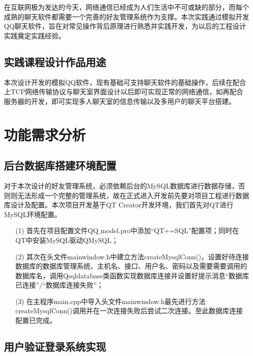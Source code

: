 \documentclass{progartcn}
\begin{document}
在互联网极为发达的今天，网络通信已经成为人们生活中不可或缺的部分，而每个成熟的聊天软件都需要一个完善的好友管理系统作为支撑。本次实践通过模拟开发QQ聊天软件，旨在对常见操作背后原理进行熟悉并实践开发，为以后的工程设计实践奠定实践经验。

\subsection{实践课程设计作品用途}

本次设计开发的模拟QQ软件，现有基础可支持聊天软件的基础操作，后续在配合上TCP网络传输协议与聊天室界面设计以后即可实现正常的网络通信，如再配合服务器的开发，即可实现多人聊天室的信息传输以及多用户的聊天平台搭建。

\section{功能需求分析}

\subsection{后台数据库搭建环境配置}

对于本次设计的好友管理系统，必须依赖后台的MySQL数据库进行数据存储，否则则无法形成一个完整的管理系统，故在正式进入开发前先要对项目工程进行数据库设计及配置。本次项目开发基于QT Creator开发环境，我们首先对QT进行MySQL环境配置。

\begin{enumerate}[itemsep=0.01pt]
	\item[(1)] 首先在项目配置文件QQ$ \_ $model.pro中添加“QT+=SQL”配置项；同时在QT中安装MySQL驱动QMySQL；
	\item[(2)] 其次在头文件mainwindow.h中建立方法createMysqlConn()，设置好待连接数据库的数据库管理系统、主机名、接口、用户名、密码以及需要需要调用的数据库名，调用Qsqldatabase类函数实现数据库连接并设置好提示消息“数据库已连接”/“数据库连接失败”；
	\item[(3)] 在主程序main.cpp中导入头文件mainwindow.h最先进行方法createMysqlConn()调用并在一次连接失败后尝试二次连接。至此数据库连接配置已完成。
\end{enumerate}

\subsection{用户验证登录系统实现}
\end{document}
